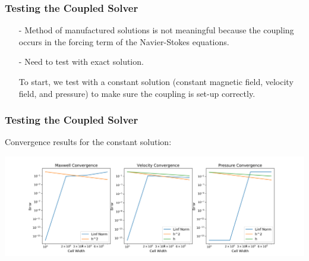 \documentclass[mathserif]{beamer} %
\begin{document}
\begin{frame}
    \frametitle{Testing the Coupled Solver}
    \begin{itemize}
            \pause
        \item[-] Method of manufactured solutions is not meaningful because the coupling occurs in the forcing term of the Navier-Stokes equations. 
            \pause
        \item[-] Need to test with exact solution.

    \vspace{.4cm}
            \pause
            To start, we test with a constant solution (constant magnetic field, velocity field, and pressure) to make sure the coupling is set-up correctly.

    \end{itemize}

\end{frame}

\begin{frame}
    \frametitle{Testing the Coupled Solver}
    Convergence results for the constant solution:

    \includegraphics[scale=.3]{full_conv.png}


\end{frame}
\end{document}
